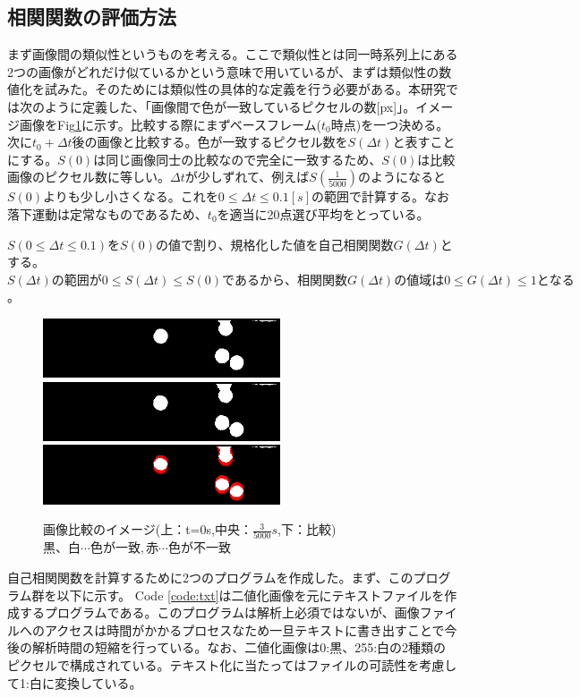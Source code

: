 \documentclass[a4paper,10pt,twocolumn,dvipdfmx]{jsarticle}
\begin{document}
\subsection{相関関数の評価方法}
まず画像間の類似性というものを考える。ここで類似性とは同一時系列上にある2つの画像がどれだけ似ているかという意味で用いているが、まずは類似性の数値化を試みた。そのためには類似性の具体的な定義を行う必要がある。本研究では次のように定義した、「画像間で色が一致しているピクセルの数[px]」。イメージ画像をFig\ref{fig:exfall}に示す。比較する際にまずベースフレーム($t_0$時点)を一つ決める。次に$t_0+\Delta t$後の画像と比較する。色が一致するピクセル数を$S(\Delta t)$と表すことにする。$S(0)$は同じ画像同士の比較なので完全に一致するため、$S(0)$は比較画像のピクセル数に等しい。$\Delta t$が少しずれて、例えば$S(\frac{1}{5000})$のようになると$S(0)$よりも少し小さくなる。これを$0 \leq \Delta t \leq 0.1 [s]$の範囲で計算する。なお落下運動は定常なものであるため、$t_0$を適当に20点選び平均をとっている。 \par
$S(0 \leq \Delta t \leq 0.1)をS(0)$の値で割り、規格化した値を自己相関関数$G(\Delta t)$とする。$S(\Delta t)の範囲が0 \leq S(\Delta t) \leq S(0)であるから、相関関数G(\Delta t)の値域は0 \leq G(\Delta t) \leq 1となる$。
\begin{figure}[hbtp]
	\includegraphics[clip,width=7.0cm]{0.png}
	\includegraphics[clip,width=7.0cm]{3.png}
	\includegraphics[clip,width=7.0cm]{0and3.png}
	\caption{画像比較のイメージ(上：t=0s,中央：$\frac{3}{5000}s$,下：比較) \newline $黒、白 \cdots 色が一致 ,赤 \cdots 色が不一致$}
	\label{fig:exfall}
\end{figure}
自己相関関数を計算するために2つのプログラムを作成した。まず、このプログラム群を以下に示す。
Code \ref{code:txt}は二値化画像を元にテキストファイルを作成するプログラムである。このプログラムは解析上必須ではないが、画像ファイルへのアクセスは時間がかかるプロセスなため一旦テキストに書き出すことで今後の解析時間の短縮を行っている。なお、二値化画像は0:黒、255:白の2種類のピクセルで構成されている。テキスト化に当たってはファイルの可読性を考慮して1:白に変換している。
\end{document}
